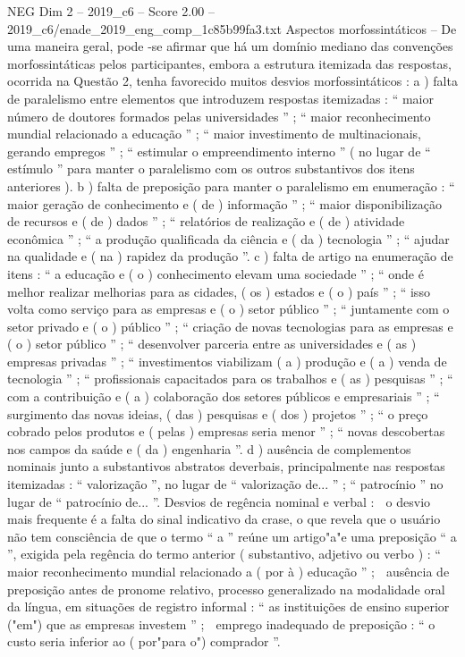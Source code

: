 \begin{textsample}{NEG Dim 2 – 2019\_c6 – Score 2.00 – 2019\_c6/enade\_2019\_eng\_comp\_1c85b99fa3.txt}
Aspectos morfossintáticos – De uma maneira geral, pode -se afirmar que há um domínio mediano das convenções morfossintáticas pelos participantes, embora a estrutura itemizada das respostas, ocorrida na Questão 2, tenha favorecido muitos desvios morfossintáticos : a ) falta de paralelismo entre elementos que introduzem respostas itemizadas : “ maior número de doutores formados pelas universidades ” ; “ maior reconhecimento mundial relacionado a educação ” ; “ maior investimento de multinacionais, gerando empregos ” ; “ estimular o empreendimento interno ” ( no lugar de “ estímulo ” para manter o paralelismo com os outros substantivos dos itens anteriores ). b ) falta de preposição para manter o paralelismo em enumeração : “ maior geração de conhecimento e ( de ) informação ” ; “ maior disponibilização de recursos e ( de ) dados ” ; “ relatórios de realização e ( de ) atividade econômica ” ; “ a produção qualificada da ciência e ( da ) tecnologia ” ; “ ajudar na qualidade e ( na ) rapidez da produção ”. c ) falta de artigo na enumeração de itens : “ a educação e ( o ) conhecimento elevam uma sociedade ” ; “ onde é melhor realizar melhorias para as cidades, ( os ) estados e ( o ) país ” ; “ isso volta como serviço para as empresas e ( o ) setor público ” ; “ juntamente com o setor privado e ( o ) público ” ; “ criação de novas tecnologias para as empresas e ( o ) setor público ” ; “ desenvolver parceria entre as universidades e ( as ) empresas privadas ” ; “ investimentos viabilizam ( a ) produção e ( a ) venda de tecnologia ” ; “ profissionais capacitados para os trabalhos e ( as ) pesquisas ” ; “ com a contribuição e ( a ) colaboração dos setores públicos e empresariais ” ; “ surgimento das novas ideias, ( das ) pesquisas e ( dos ) projetos ” ; “ o preço cobrado pelos produtos e ( pelas ) empresas seria menor ” ; “ novas descobertas nos campos da saúde e ( da ) engenharia ”. d ) ausência de complementos nominais junto a substantivos abstratos deverbais, principalmente nas respostas itemizadas : “ valorização ”, no lugar de “ valorização de... ” ; “ patrocínio ” no lugar de “ patrocínio de... ”.
Desvios de regência nominal e verbal :  o desvio mais frequente é a falta do sinal indicativo da crase, o que revela que o usuário não tem consciência de que o termo “ a ” reúne um artigo"a"e uma preposição “ a ”, exigida pela regência do termo anterior ( substantivo, adjetivo ou verbo ) : “ maior reconhecimento mundial relacionado a ( por à ) educação ” ;  ausência de preposição antes de pronome relativo, processo generalizado na modalidade oral da língua, em situações de registro informal : “ as instituições de ensino superior ("em") que as empresas investem ” ;  emprego inadequado de preposição : “ o custo seria inferior ao ( por"para o") comprador ”.

\end{textsample}
